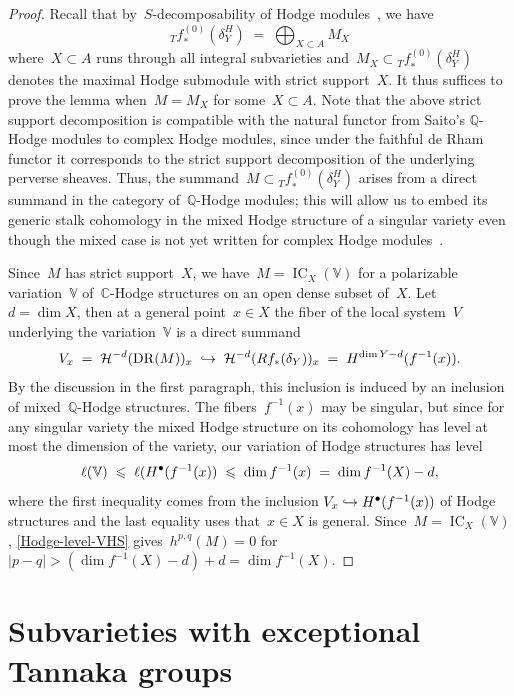 \documentclass[a4paper]{amsart}
\newcommand{\bbC}{\mathbb{C}}
\newcommand{\bbQ}{\mathbb{Q}}
\newcommand{\bbV}{\mathbb{V}}
\newcommand{\cH}{\mathcal{H}}
\newcommand{\rH}{\textup{H}}
\newcommand{\sssT}{\scriptscriptstyle{T}}
\newcommand{\tfstar}{{_{\sssT}f}_*}
\DeclareMathOperator{\IC}{IC}
\DeclareMathOperator{\DR}{DR}
\renewcommand{\le}{\leqslant}
\theoremstyle{plain}
\theoremstyle{definition}
\numberwithin{equation}{section}
\begin{document}
\begin{proof} 
Recall that by~$S$-decomposability of Hodge modules~\cite[th.~14.2.19(1)]{MHMProject}, we have  
%
\[ \tfstar^{(0)}(\delta_Y^H) \;=\; \bigoplus_{X\subset A} M_X \]
%
where~$X\subset A$ runs through all integral subvarieties and~$M_X \subset \tfstar^{(0)}(\delta_Y^H)$ denotes the maximal Hodge submodule with strict support~$X$. It thus suffices to prove the lemma when~$M=M_X$ for some~$X\subset A$. Note that the above strict support decomposition is compatible with the natural functor from Saito's $\bbQ$-Hodge modules to complex Hodge modules, since under the faithful de Rham functor it corresponds to the strict support decomposition of the underlying perverse sheaves. Thus, the summand~$M\subset \tfstar^{(0)}(\delta_Y^H)$ arises from a direct summand in the category of~$\bbQ$-Hodge modules; this will allow us to embed its generic stalk cohomology in the mixed Hodge structure of a singular variety even though the mixed case is not yet written for complex Hodge modules~\cite{MHMProject}. 

\medskip

Since~$M$ has strict support~$X$, we have~$M=\IC_X(\bbV)$ for a polarizable variation~$\bbV$ of~$\bbC$-Hodge structures on an open dense subset of~$X$. Let~$d=\dim X$, then at a general point~$x\in X$ the fiber of the local system~$V$ underlying the variation~$\bbV$ is a direct summand 
%
\[
 V_x \;=\; \cH^{-d}(\DR(M))_x \;\hookrightarrow\; \cH^{-d}(Rf_*(\delta_Y))_x \;=\; \rH^{\dim Y - d}(f^{-1}(x)).
\]
%
By the discussion in the first paragraph, this inclusion is induced by an inclusion of mixed~$\bbQ$-Hodge structures. The fibers~$f^{-1}(x)$ may be singular, but since for any singular variety the mixed Hodge structure on its cohomology has level at most the dimension of the variety, our variation of Hodge structures has level 
%
\[
 \ell(\bbV) \;\le\; \ell(\rH^\bullet(f^{-1}(x)) \;\le\; \dim f^{-1}(x) \;=\;  \dim f^{-1}(X) - d,
\]
%
where the first inequality comes from the inclusion $V_x \hookrightarrow \rH^{\bullet}(f^{-1}(x))$ of Hodge structures and the last equality uses that~$x\in X$ is general. Since~$M=\IC_X(\bbV)$, \cref{Hodge-level-VHS} gives~$h^{p,q}(M) = 0$ for~$|p-q|> (\dim f^{-1}(X) - d) + d = \dim f^{-1}(X)$.
\end{proof}



\section{Subvarieties with exceptional Tannaka groups}
\end{document}
